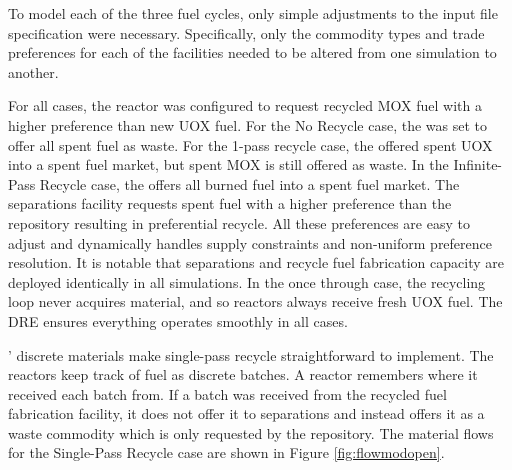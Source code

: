 To model each of the three fuel cycles, only simple 
adjustments to the input file specification were necessary. Specifically,  
only the commodity types and trade preferences for
each of the facilities needed to be altered from one simulation to another. 

For all cases, the reactor was configured to request recycled \gls{MOX}
fuel with a higher preference than new \gls{UOX} fuel. For the No Recycle case,
the  was set to offer all spent fuel as waste.  For the 1-pass
recycle case, the  offered spent \gls{UOX} into a spent fuel market,
but spent \gls{MOX} is still offered as waste.  In the Infinite-Pass Recycle case,
the  offers all burned fuel into a spent fuel market. The
separations facility requests spent fuel with a higher preference than the
repository resulting in preferential recycle.  All these preferences are easy
to adjust and \Cyclus dynamically handles supply constraints and non-uniform
preference resolution.  It is notable that separations and recycle fuel
fabrication capacity are deployed identically in all simulations.  In the once
through case, the recycling loop never acquires material, and so reactors
always receive fresh \gls{UOX} fuel.  The \gls{DRE} ensures everything operates
smoothly in all cases.

\Cyclus' discrete materials make single-pass recycle straightforward to implement.  The
reactors keep track of fuel as discrete batches. A reactor remembers where it
received each batch from.  If a batch was received from the recycled fuel
fabrication facility, it does not offer it to separations and instead offers
it as a waste commodity which is only requested by the repository.  The
material flows for the Single-Pass Recycle case are shown in Figure
\ref{fig:flowmodopen}.

